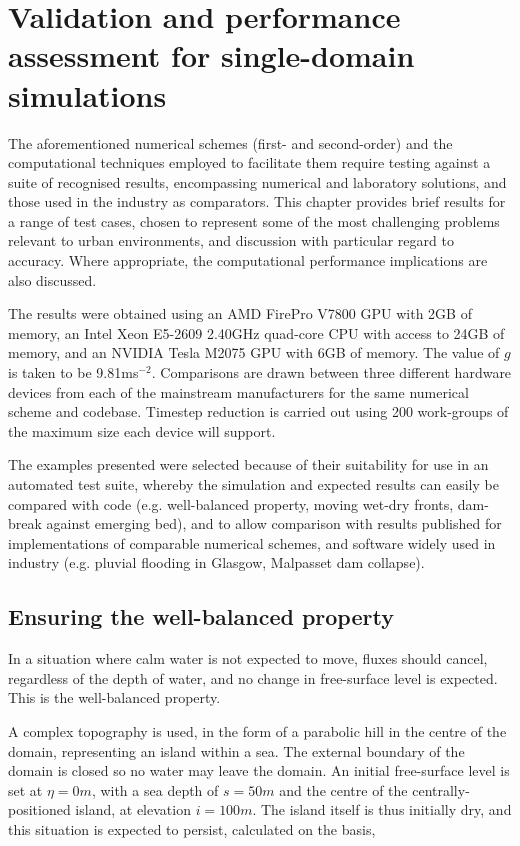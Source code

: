 \chapter{Validation and performance assessment for single-domain simulations}
\label{chapter:NumericalValidation}

The aforementioned numerical schemes (first- and second-order) and the computational techniques employed to facilitate them require testing against a suite of recognised results, encompassing numerical and laboratory solutions, and those used in the industry as comparators. This chapter provides brief results for a range of test cases, chosen to represent some of the most challenging problems relevant to urban environments, and discussion with particular regard to accuracy. Where appropriate, the computational performance implications are also discussed.

The results were obtained using an AMD FirePro V7800 GPU with 2GB of memory, an Intel Xeon E5-2609 2.40GHz quad-core CPU with access to 24GB of memory, and an NVIDIA Tesla M2075 GPU with 6GB of memory. The value of \(g\) is taken to be 9.81ms\(^{-2}\). Comparisons are drawn between three different hardware devices from each of the mainstream manufacturers for the same numerical scheme and codebase. Timestep reduction is carried out using 200 work-groups of the maximum size each device will support.

The examples presented were selected because of their suitability for use in an automated test suite, whereby the simulation and expected results can easily be compared with code (e.g. well-balanced property, moving wet-dry fronts, dam-break against emerging bed), and to allow comparison with results published for implementations of comparable numerical schemes, and software widely used in industry (e.g. pluvial flooding in Glasgow, Malpasset dam collapse).

\section{Ensuring the well-balanced property}

In a situation where calm water is not expected to move, fluxes should cancel, regardless of the depth of water, and no change in free-surface level is expected. This is the well-balanced property.

A complex topography is used, in the form of a parabolic hill in the centre of the domain, representing an island within a sea. The external boundary of the domain is closed so no water may leave the domain. An initial free-surface level is set at $\eta = 0m$, with a sea depth of $s = 50m$ and the centre of the centrally-positioned island, at elevation $i = 100m$. The island itself is thus initially dry, and this situation is expected to persist, calculated on the basis,

